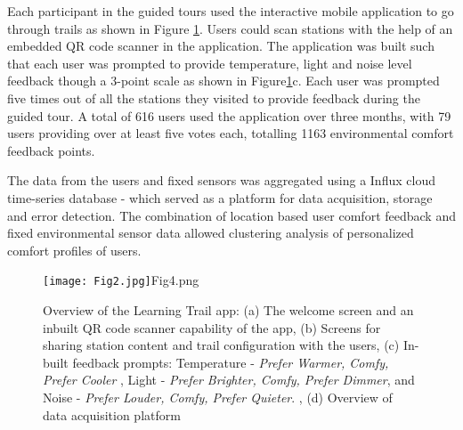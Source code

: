 Each participant in the guided tours used the interactive mobile application to go through trails as shown in Figure \ref{fig:mobileapp}. Users could scan stations with the help of an embedded QR code scanner in the application. The application was built such that each user was prompted to provide temperature, light and noise level feedback though a 3-point scale as shown in Figure\ref{fig:mobileapp}c. Each user was prompted five times out of all the stations they visited to provide feedback during the guided tour. A total of 616 users used the application over three months, with 79 users providing over at least five votes each, totalling 1163 environmental comfort feedback points.

The data from the users and fixed sensors was aggregated using a Influx cloud time-series database - which served as a platform for data acquisition, storage and error detection. The combination of location based user comfort feedback and fixed environmental sensor data allowed clustering analysis of personalized comfort profiles of users. 

\begin{figure}
\begin{center}
\texttt{[image: Fig2.jpg]}{Fig4.png}
\caption{Overview of the Learning Trail app: (a) The welcome screen and an inbuilt QR code scanner capability of the app, (b) Screens for sharing station content and trail configuration with the users, (c) In-built feedback prompts: Temperature - \emph{Prefer Warmer, Comfy, Prefer Cooler} , Light - \emph{Prefer Brighter, Comfy, Prefer Dimmer}, and Noise - \emph{Prefer Louder, Comfy, Prefer Quieter}.  , (d) Overview of data acquisition platform}
\label{fig:mobileapp}
\end{center}
\end{figure}

